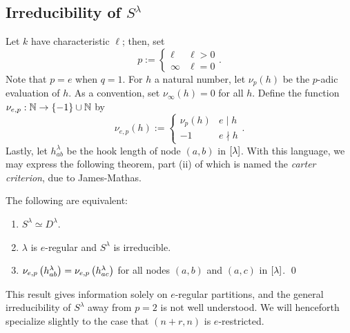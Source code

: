 \documentclass{amsart}
\begin{document}
  \subsection{Irreducibility of $S^\lambda$}
  Let $k$ have characteristic $\ell$;
  then, set
  \[
    p := \begin{cases}
      \ell & \ell > 0\\
      \infty & \ell = 0
    \end{cases}.
  \]
  Note that $p = e$ when $q = 1$.
  For $h$ a natural number, let $\nu_p(h)$ be the $p$-adic evaluation of $h$.
  As a convention, set $\nu_\infty(h) = 0$ for all $h$.
  Define the function $\nu_{e,p} : \mathbb{N} \rightarrow \left\{ -1 \right\} \cup \mathbb{N}$ by
  \[
    \nu_{e,p}(h) := \begin{cases}
      \nu_p(h) & e \mid h\\
      -1 & e \nmid h
    \end{cases}.
  \]
  Lastly, let $h_{ab}^\lambda$ be the hook length of node $(a,b)$ in $\left[ \lambda \right]$.
  With this language, we may express the following theorem, part (ii) of which is named the \emph{carter criterion}, due to James-Mathas.\cite{Mathas-book}
  \begin{theorem}
    The following are equivalent:
    \begin{enumerate}[label={(\roman*)}]
      \item $S^{\lambda} \simeq D^{\lambda}$.
      \item $\lambda$ is $e$-regular and $S^\lambda$ is irreducible.
      \item $\nu_{e,p}\left( h_{ab}^\lambda \right) = \nu_{e,p}\left( h_{ac}^\lambda \right)$ for all nodes $(a,b)$ and $(a,c)$ in $\left[ \lambda \right]$.
    \qed\end{enumerate}
  \end{theorem}
  This result gives information solely on $e$-regular partitions, and the general irreducibility of $S^\lambda$ away from $p=2$ is not well understood.
  We will henceforth specialize slightly to the case that $(n+r,n)$ is $e$-restricted. 
\end{document}
